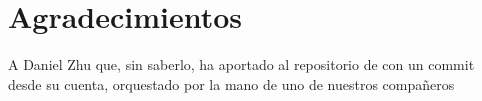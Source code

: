 
\chapter*{Agradecimientos}

A Daniel Zhu que, sin saberlo, ha aportado al repositorio de \appName{} con un commit desde su cuenta, orquestado por la mano de uno de nuestros compañeros











